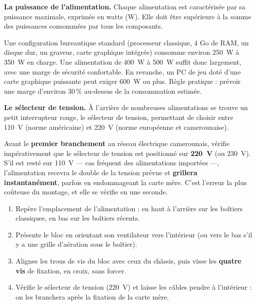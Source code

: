 \documentclass[11pt]{article}
\newcommand{\cle}[1]{{\popxbold\color{popdark}#1}}
\begin{document}
\textbf{La puissance de l'alimentation.} Chaque alimentation est caractérisée par sa \cle{puissance} maximale, exprimée en \cle{watts} (W). Elle doit être supérieure à la somme des puissances consommées par tous les composants.

\begin{exemplebox}
Une configuration bureautique standard (processeur classique, 4 Go de RAM, un disque dur, un graveur, carte graphique intégrée) consomme environ \SI{250}{W} à \SI{350}{W} en charge. Une alimentation de \SI{400}{W} à \SI{500}{W} suffit donc largement, avec une marge de sécurité confortable. En revanche, un PC de jeu doté d'une carte graphique puissante peut exiger \SI{600}{W} ou plus. Règle pratique : prévoir une marge d'environ 30\,\% au-dessus de la consommation estimée.
\end{exemplebox}

\textbf{Le sélecteur de tension.} À l'arrière de nombreuses alimentations se trouve un petit interrupteur rouge, le \cle{sélecteur de tension}, permettant de choisir entre \SI{110}{V} (norme américaine) et \SI{220}{V} (norme européenne et camerounaise).

\begin{attention}
Avant le \textbf{premier branchement} au réseau électrique camerounais, vérifie impérativement que le sélecteur de tension est positionné sur \textbf{\SI{220}{V}} (ou \SI{230}{V}). S'il est resté sur \SI{110}{V} — cas fréquent des alimentations importées —, l'alimentation recevra le double de la tension prévue et \textbf{grillera instantanément}, parfois en endommageant la carte mère. C'est l'erreur la plus coûteuse du montage, et elle se vérifie en une seconde.
\end{attention}

\begin{methode}
\begin{enumerate}
\item Repère l'emplacement de l'alimentation : en haut à l'arrière sur les boîtiers classiques, en bas sur les boîtiers récents.
\item Présente le bloc en orientant son ventilateur vers l'intérieur (ou vers le bas s'il y a une grille d'aération sous le boîtier).
\item Alignes les trous de vis du bloc avec ceux du châssis, puis visse les \textbf{quatre vis} de fixation, en croix, sans forcer.
\item Vérifie le sélecteur de tension (\SI{220}{V}) et laisse les câbles pendre à l'intérieur : on les branchera après la fixation de la carte mère.
\end{enumerate}
\end{methode}
\end{document}

